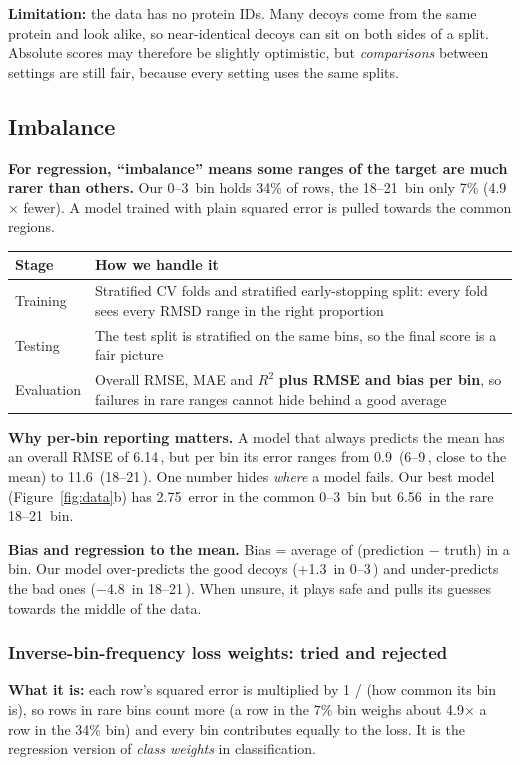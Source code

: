 \documentclass[11pt,a4paper]{article}
\newcommand{\A}{\,\text{\AA}}
\begin{document}
\textbf{Limitation:} the data has no protein IDs. Many decoys come from the same protein and look alike, so
near-identical decoys can sit on both sides of a split. Absolute scores may therefore be slightly optimistic, but
\emph{comparisons} between settings are still fair, because every setting uses the same splits.

\subsection{Imbalance}
\textbf{For regression, ``imbalance'' means some ranges of the target are much rarer than others.} Our 0--3\A{} bin holds
34\% of rows, the 18--21\A{} bin only 7\% (4.9$\times$ fewer). A model trained with plain squared error is pulled
towards the common regions.

\begin{tabularx}{\linewidth}{@{}lY@{}}
\toprule
Stage & How we handle it \\
\midrule
Training & Stratified CV folds and stratified early-stopping split: every fold sees every RMSD range in the right proportion \\
Testing & The test split is stratified on the same bins, so the final score is a fair picture \\
Evaluation & Overall RMSE, MAE and $R^2$ \textbf{plus RMSE and bias per bin}, so failures in rare ranges cannot hide behind a good average \\
\bottomrule
\end{tabularx}

\textbf{Why per-bin reporting matters.} A model that always predicts the mean has an overall RMSE of 6.14\A, but per bin
its error ranges from 0.9\A{} (6--9\A, close to the mean) to 11.6\A{} (18--21\A). One number hides \emph{where} a model
fails. Our best model (Figure~\ref{fig:data}b) has 2.75\A{} error in the common 0--3\A{} bin but 6.56\A{} in the rare
18--21\A{} bin.

\textbf{Bias and regression to the mean.} Bias = average of (prediction $-$ truth) in a bin. Our model over-predicts the
good decoys (+1.3\A{} in 0--3\A) and under-predicts the bad ones ($-$4.8\A{} in 18--21\A). When unsure, it plays safe
and pulls its guesses towards the middle of the data.

\subsubsection*{Inverse-bin-frequency loss weights: tried and rejected}
\textbf{What it is:} each row's squared error is multiplied by 1 / (how common its bin is), so rows in rare bins count
more (a row in the 7\% bin weighs about 4.9$\times$ a row in the 34\% bin) and every bin contributes equally to the loss.
It is the regression version of \emph{class weights} in classification.
\end{document}

